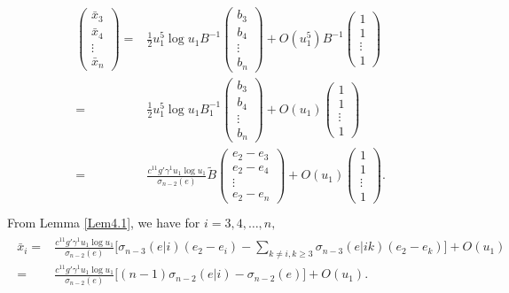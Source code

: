 \documentclass[11pt]{amsart}
\numberwithin{equation}{section}
\begin{document}
\begin{align}\label{4.12}
\begin{split}
\left(\begin{array}{c}
\bar{x}_{3}\\
\bar{x}_{4}\\
\vdots  \\
\bar{x}_{n}
\end{array}\right)=&\frac{1}{2}u_1^5\log u_1B^{-1}
\left(\begin{array}{c}
b_{3}\\
b_{4}\\
\vdots\\
b_{n}
\end{array}\right)+ O(u_1^5)B^{-1}
\left(\begin{array}{c}
1\\
1\\
\vdots\\
1
\end{array}\right)\\
=&\frac{1}{2}u_1^5\log u_1B_1^{-1}\left(\begin{array}{c}
b_{3}\\
b_{4}\\
\vdots\\
b_{n}
\end{array}\right)+ O(u_1)
\left(\begin{array}{c}
1\\
1\\
\vdots\\
1
\end{array}\right)\\
=&\frac{c^{11}g'\gamma^1u_1\log u_1}{\sigma_{n-2}(e)}\tilde{B}
\left(\begin{array}{c}
e_2-e_3\\
e_2-e_4\\
\vdots\\
e_2-e_n
\end{array}\right)+ O(u_1)
\left(\begin{array}{c}
1\\
1\\
\vdots\\
1
\end{array}\right).\\
\end{split}
\end{align}
From Lemma \ref{Lem4.1}, we have for $i=3,4,\ldots,n,$
\begin{align}\label{4.13}
\begin{split}
\bar{x}_{i}=&\frac{c^{11}g'\gamma^1u_1\log u_1}{\sigma_{n-2}(e)}\big[\sigma_{n-3}(e|i)(e_2-e_i)-\sum_{k\neq i, k\geq 3}\sigma_{n-3}(e|ik)(e_2-e_k)\big]+ O(u_1)\\
=&\frac{c^{11}g'\gamma^1u_1\log u_1}{\sigma_{n-2}(e)}\big[(n-1)\sigma_{n-2}(e|i)-\sigma_{n-2}(e)\big]+ O(u_1).
\end{split}
\end{align}
\end{document}
